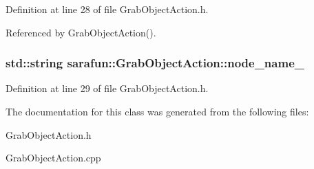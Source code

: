 Definition at line 28 of file Grab\-Object\-Action.\-h.



Referenced by Grab\-Object\-Action().

\hypertarget{classsarafun_1_1GrabObjectAction_a586c34a94df1b7d435617d6b753d9e11_a586c34a94df1b7d435617d6b753d9e11}{
\subsubsection[{node\-\_\-name\-\_\-}]{\setlength{\rightskip}{0pt plus 5cm}std\-::string sarafun\-::\-Grab\-Object\-Action\-::node\-\_\-name\-\_\-\hspace{0.3cm}{\ttfamily [private]}}}\label{classsarafun_1_1GrabObjectAction_a586c34a94df1b7d435617d6b753d9e11_a586c34a94df1b7d435617d6b753d9e11}


Definition at line 29 of file Grab\-Object\-Action.\-h.



The documentation for this class was generated from the following files\-:\begin{DoxyCompactItemize}
\item 
Grab\-Object\-Action.\-h\item 
Grab\-Object\-Action.\-cpp\end{DoxyCompactItemize}
